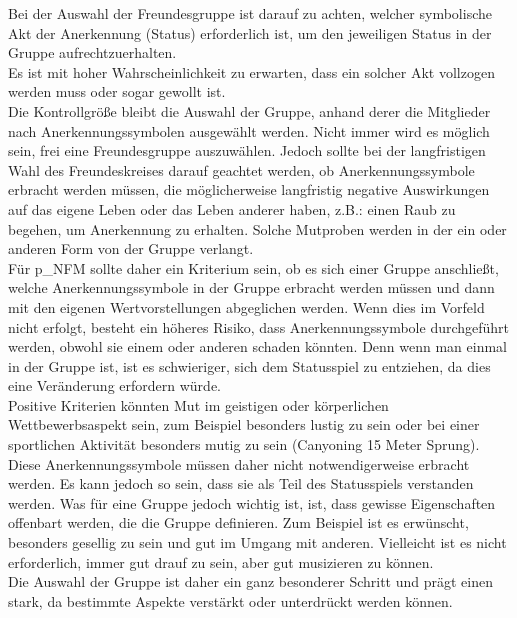 Bei der Auswahl der Freundesgruppe ist darauf zu achten, welcher symbolische Akt der Anerkennung (Status) erforderlich ist, um den jeweiligen Status in der Gruppe aufrechtzuerhalten.\\

Es ist mit hoher Wahrscheinlichkeit zu erwarten, dass ein solcher Akt vollzogen werden muss oder sogar gewollt ist.\\

Die Kontrollgröße bleibt die Auswahl der Gruppe, anhand derer die Mitglieder nach Anerkennungssymbolen ausgewählt werden. Nicht immer wird es möglich sein, frei eine Freundesgruppe auszuwählen. Jedoch sollte bei der langfristigen Wahl des Freundeskreises darauf geachtet werden, ob Anerkennungssymbole erbracht werden müssen, die möglicherweise langfristig negative Auswirkungen auf das eigene Leben oder das Leben anderer haben, z.B.: einen Raub zu begehen, um Anerkennung zu erhalten. Solche Mutproben werden in der ein oder anderen Form von der Gruppe verlangt.\\

Für \gls{p_NFM} sollte daher ein Kriterium sein, ob es sich einer Gruppe anschließt, welche Anerkennungssymbole in der Gruppe erbracht werden müssen und dann mit den eigenen Wertvorstellungen abgeglichen werden. Wenn dies im Vorfeld nicht erfolgt, besteht ein höheres Risiko, dass Anerkennungssymbole durchgeführt werden, obwohl sie einem oder anderen schaden könnten. Denn wenn man einmal in der Gruppe ist, ist es schwieriger, sich dem Statusspiel zu entziehen, da dies eine Veränderung erfordern würde.\\

Positive Kriterien könnten Mut im geistigen oder körperlichen Wettbewerbsaspekt sein, zum Beispiel besonders lustig zu sein oder bei einer sportlichen Aktivität besonders mutig zu sein (Canyoning 15 Meter Sprung).\\

Diese Anerkennungssymbole müssen daher nicht notwendigerweise erbracht werden. Es kann jedoch so sein, dass sie als Teil des Statusspiels verstanden werden. Was für eine Gruppe jedoch wichtig ist, ist, dass gewisse Eigenschaften offenbart werden, die die Gruppe definieren. Zum Beispiel ist es erwünscht, besonders gesellig zu sein und gut im Umgang mit anderen. Vielleicht ist es nicht erforderlich, immer gut drauf zu sein, aber gut musizieren zu können.\\

Die Auswahl der Gruppe ist daher ein ganz besonderer Schritt und prägt einen stark, da bestimmte Aspekte verstärkt oder unterdrückt werden können.

